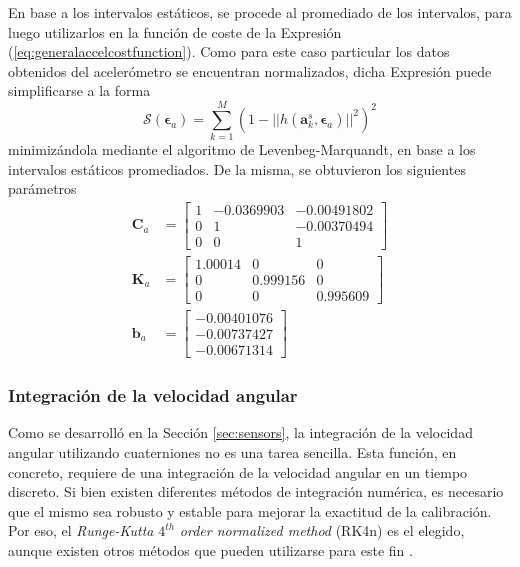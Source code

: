 En base a los intervalos estáticos, se procede al promediado de los intervalos, para luego utilizarlos en la función de coste de la Expresión (\ref{eq:generalaccelcostfunction}). Como para este caso particular los datos obtenidos del acelerómetro se encuentran normalizados, dicha Expresión puede simplificarse a la forma
\begin{equation}
    \mathscr{S}(\bm{\epsilon}_{a}) = \sum_{k=1}^M(1-||h(\bm{a}^s_k,\bm{\epsilon}_{a})||^2)^2
    \label{eq:mpu9250accelcostfunction}
\end{equation}
minimizándola mediante el algoritmo de Levenbeg-Marquandt, en base a los intervalos estáticos promediados. De la misma, se obtuvieron los siguientes parámetros
\begin{align}
        \bm{C}_a &=
    \begin{bmatrix}
        1 & -0.0369903 & -0.00491802 \\
        0 & 1 & -0.00370494 \\
        0 & 0 & 1
    \end{bmatrix}
    \\
        \bm{K}_a &=
    \begin{bmatrix}
        1.00014 & 0 & 0 \\
        0 & 0.999156 & 0 \\
        0 & 0 & 0.995609
    \end{bmatrix}
    \\
    \bm{b}_a &=
    \begin{bmatrix}
        -0.00401076 \\
        -0.00737427 \\
        -0.00671314
    \end{bmatrix}
\end{align}

\subsubsection{Integración de la velocidad angular}
Como se desarrolló en la Sección \ref{sec:sensors}, la integración de la velocidad angular utilizando cuaterniones no es una tarea sencilla.
Esta función, en concreto, requiere de una integración de la velocidad angular en un tiempo discreto. Si bien existen diferentes métodos de integración numérica, es necesario que el mismo sea robusto y estable para mejorar la exactitud de la calibración. Por eso, el \textit{Runge-Kutta} $4^{th}$ \textit{order normalized method} (RK4n) \cite{suli2014} es el elegido, aunque existen otros métodos que pueden utilizarse para este fin \cite{andrle2013}.

